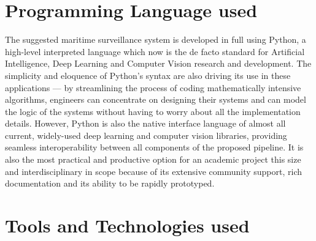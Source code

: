 \section{Programming Language used}

The suggested maritime surveillance system is developed in full using Python, a high-level interpreted language which now is the de facto standard for Artificial Intelligence, Deep Learning and Computer Vision research and development. The simplicity and eloquence of Python's syntax are also driving its use in these applications — by streamlining the process of coding mathematically intensive algorithms, engineers can concentrate on designing their systems and can model the logic of the systems without having to worry about all the implementation details. However, Python is also the native interface language of almost all current, widely-used deep learning and computer vision libraries, providing seamless interoperability between all components of the proposed pipeline. It is also the most practical and productive option for an academic project this size and interdisciplinary in scope because of its extensive community support, rich documentation and its ability to be rapidly prototyped.

\section{Tools and Technologies used}

